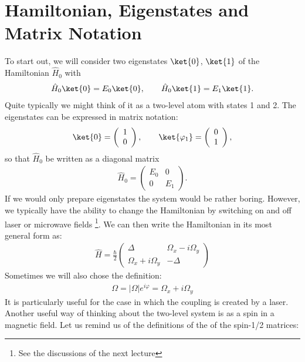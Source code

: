 \section{Hamiltonian, Eigenstates and Matrix Notation}

To start out, we will consider two eigenstates $\ket{0}$, $\ket{1}$ of the Hamiltonian $\hat{H}_0$ with
\begin{align}
 \hat{H}_0\ket{0}=E_0\ket{0}, \qquad \hat{H}_0\ket{1}=E_1\ket{1}.
\end{align}
Quite typically we might think of it as a two-level atom with states 1 and 2. The eigenstates can be expressed in matrix notation:
\begin{align}
 \ket{0}=\left( \begin{array}{c} 1 \\ 0 \end{array} \right), \qquad \ket{\varphi_1}=\left( \begin{array}{c} 0 \\ 1 \end{array} \right),
\end{align}
so that $\hat{H}_0$ be written as a diagonal matrix
\begin{align}
    \hat{H}_0 = \left(\begin{array}{cc} E_0 & 0 \\ 0 & E_1 \end{array}\right).
\end{align}
If we would only prepare eigenstates the system would be rather boring. However, we typically have the ability to change the Hamiltonian by switching on and off laser or microwave fields \footnote{See the discussions of the next lecture}. We can then write the Hamiltonian in its most general form as:
\begin{align}\label{Eq:TwoLevelGeneral}
\hat{H} = \frac{\hbar}{2}\left( \begin{array}{cc} \Delta  & \Omega_x - i\Omega_y\\ \Omega_x +i\Omega_y & -\Delta \end{array} \right)
\end{align}
Sometimes we will also chose the definition:
\begin{align}
\Omega = |\Omega| e^{i\varphi}=\Omega_x + i\Omega_y
\end{align}
It is particularly useful for the case in which the coupling is created by a laser. Another useful way of thinking about the two-level system is as a spin in a magnetic field. Let us remind us of the definitions of the of the spin-1/2 matrices:
